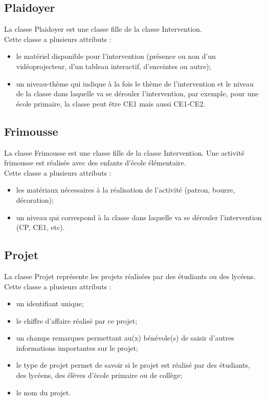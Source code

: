 \documentclass[asi, sansVersion]{picInsa}
\begin{document}
\subsection*{Plaidoyer}
La classe Plaidoyer est une classe fille de la classe Intervention. \\
Cette classe a plusieurs attributs : 
\begin{itemize}
\item le matériel disponible pour l'intervention (présence ou non d'un vidéoprojecteur, d'un tableau interactif, d'enceintes ou autre);
\item un niveau-thème qui indique à la fois le thème de l'intervention et le niveau de la classe dans laquelle va se dérouler l'intervention, par exemple, pour une école primaire, la classe peut être CE1 mais aussi CE1-CE2.
\end{itemize}

\subsection*{Frimousse}
La classe Frimousse est une classe fille de la classe Intervention. Une activité frimousse est réalisée avec des enfants d'école élémentaire. \\
Cette classe a plusieurs attributs :
\begin{itemize}
\item les matériaux nécessaires à la réalisation de l'activité (patron, bourre, décoration);
\item un niveau qui correspond à la classe dans laquelle va se dérouler l'intervention (CP, CE1, etc).
\end{itemize}

\subsection*{Projet}
La classe Projet représente les projets réalisées par des étudiants ou des lycéens.\\
Cette classe a plusieurs attributs : 
\begin{itemize}
\item un identifiant unique;
\item le chiffre d'affaire réalisé par ce projet;
\item un champs remarques permettant au(x) bénévole(s) de saisir d'autres informations importantes sur le projet;
\item le type de projet permet de savoir si le projet est réalisé par des étudiants, des lycéens, des élèves d'école primaire ou de collège;
\item le nom du projet.
\end{itemize}
\end{document}
